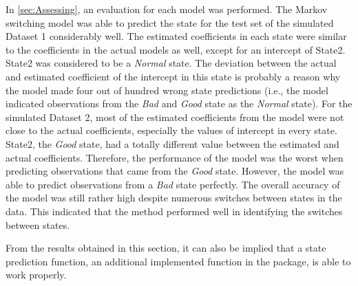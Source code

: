 \begin{comment}
This can be observed by examining the results from \ref{sec:Assessing}.
The accuracy of the model for the test set in the simulated Dataset
1 was significantly high. One reason is that the simulated data had
an obvious pattern in switching between states. Besides, each state
remained in its own state for a while before switching to the other
states. Therefore, the model can completely capture the behavior of
the time series data. In contrast, the simulated Dataset 2 had several
switches between states and each state did not have a long duration.
Even though the pattern of the response variable is rather difficult
to see in the plot, the Markov switching model still perform rather
well for this dataset.
\end{comment}

In \ref{sec:Assessing}, an evaluation for each model was performed.
The Markov switching model was able to predict the state for the test
set of the simulated Dataset 1 considerably well. The estimated coefficients
in each state were similar to the coefficients in the actual models
as well, except for an intercept of State2. State2 was considered
to be a \emph{Normal} state. The deviation between the actual and
estimated coefficient of the intercept in this state is probably a
reason why the model made four out of hundred wrong state predictions
(i.e., the model indicated observations from the \emph{Bad} and \emph{Good}
state as the \emph{Normal} state). For the simulated Dataset 2, most
of the estimated coefficients from the model were not close to the
actual coefficients, especially the values of intercept in every state.
State2, the \emph{Good }state, had a totally different value between
the estimated and actual coefficients. Therefore, the performance
of the model was the worst when predicting observations that came
from the \emph{Good} state. However, the model was able to predict
observations from a \emph{Bad} state perfectly. The overall accuracy
of the model was still rather high despite numerous switches between
states in the data. This indicated that the method performed well
in identifying the switches between states. 

From the results obtained in this section, it can also be implied
that a state prediction function, an additional implemented function
in the package, is able to work properly. 


